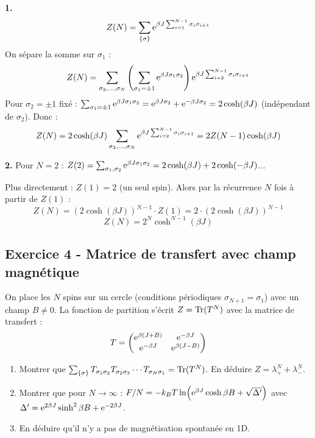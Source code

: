 \documentclass[12pt,a4paper]{article}
\begin{document}
\begin{boitecorrige}
\textbf{1.}
\[
Z(N) = \sum_{\{\sigma\}}\mathrm{e}^{\beta J\sum_{i=1}^{N-1}\sigma_i\sigma_{i+1}}
\]
On sépare la somme sur $\sigma_1$ :
\[
Z(N) = \sum_{\sigma_2,\dots,\sigma_N}\left(\sum_{\sigma_1=\pm1}\mathrm{e}^{\beta J\sigma_1\sigma_2}\right)\mathrm{e}^{\beta J\sum_{i=2}^{N-1}\sigma_i\sigma_{i+1}}
\]
Pour $\sigma_2 = \pm1$ fixé : $\sum_{\sigma_1=\pm1}\mathrm{e}^{\beta J\sigma_1\sigma_2} = \mathrm{e}^{\beta J\sigma_2} + \mathrm{e}^{-\beta J\sigma_2} = 2\cosh(\beta J)$ (indépendant de $\sigma_2$). Donc :
\[
Z(N) = 2\cosh(\beta J)\sum_{\sigma_2,\dots,\sigma_N}\mathrm{e}^{\beta J\sum_{i=2}^{N-1}\sigma_i\sigma_{i+1}} = 2Z(N-1)\cosh(\beta J)
\]

\textbf{2.} Pour $N=2$ : $Z(2) = \sum_{\sigma_1,\sigma_2}\mathrm{e}^{\beta J\sigma_1\sigma_2} = 2\cosh(\beta J) + 2\cosh(-\beta J)$...

Plus directement : $Z(1) = 2$ (un seul spin). Alors par la récurrence $N$ fois à partir de $Z(1)$ :
\[
Z(N) = (2\cosh(\beta J))^{N-1}\cdot Z(1) = 2\cdot(2\cosh(\beta J))^{N-1}
\]
\[
\boxed{Z(N) = 2^N\cosh^{N-1}(\beta J)}
\]
\end{boitecorrige}

\subsection*{Exercice 4 - Matrice de transfert avec champ magnétique \niveau{\difficile}}

\begin{boiteexercice}
On place les $N$ spins sur un cercle (conditions périodiques $\sigma_{N+1}=\sigma_1$) avec un champ $B\neq0$. La fonction de partition s'écrit $Z = \mathrm{Tr}(T^N)$ avec la matrice de transfert :
\[
T = \begin{pmatrix}\mathrm{e}^{\beta(J+B)} & \mathrm{e}^{-\beta J} \\ \mathrm{e}^{-\beta J} & \mathrm{e}^{\beta(J-B)}\end{pmatrix}
\]

\begin{enumerate}
  \item Montrer que $\sum_{\{\sigma\}}T_{\sigma_1\sigma_2}T_{\sigma_2\sigma_3}\cdots T_{\sigma_N\sigma_1} = \mathrm{Tr}(T^N)$. En déduire $Z = \lambda_+^N + \lambda_-^N$.
  \item Montrer que pour $N\to\infty$ : $F/N = -k_BT\ln\!\left(\mathrm{e}^{\beta J}\cosh\beta B + \sqrt{\Delta'}\right)$ avec $\Delta' = \mathrm{e}^{2\beta J}\sinh^2\beta B + \mathrm{e}^{-2\beta J}$.
  \item En déduire qu'il n'y a pas de magnétisation spontanée en 1D.
\end{enumerate}
\end{boiteexercice}
\end{document}

